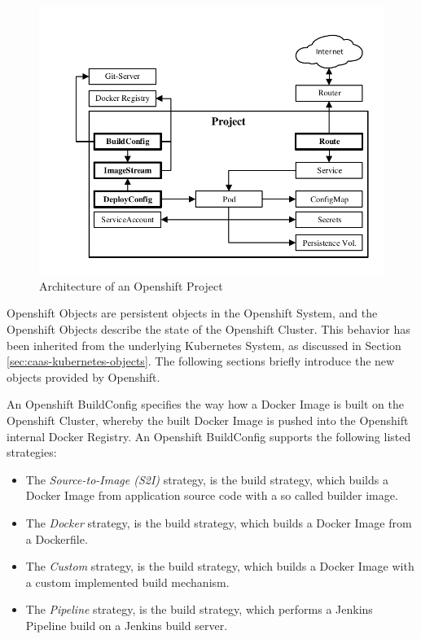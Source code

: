 \begin{figure}[htbp]
	\centering
	\includegraphics[scale=1]{images/openshift-project-architecture.pdf}
	\caption{Architecture of an Openshift Project}
	\label{fig:paas-openshift-project-architecture}
\end{figure} 

Openshift Objects are persistent objects in the Openshift System, and the Openshift Objects describe the state of the Openshift Cluster. This behavior has been inherited from the underlying Kubernetes System, as discussed in Section \vref{sec:caas-kubernetes-objects}. The following sections briefly introduce the new objects provided by Openshift. 

An Openshift BuildConfig specifies the way how a Docker Image is built on the Openshift Cluster, whereby the built Docker Image is pushed into the Openshift internal Docker Registry. An Openshift BuildConfig supports the following listed strategies:
\begin{itemize}
	\item The \emph{Source-to-Image (S2I)} strategy, is the build strategy, which builds a Docker Image from application source code with a so called builder image.
	\item The \emph{Docker} strategy, is the build strategy, which builds a Docker Image from a Dockerfile.
	\item The \emph{Custom} strategy, is the build strategy, which builds a Docker Image with a custom implemented build mechanism.
	\item The \emph{Pipeline} strategy, is the build strategy, which performs a Jenkins Pipeline build on a Jenkins build server.
\end{itemize}

